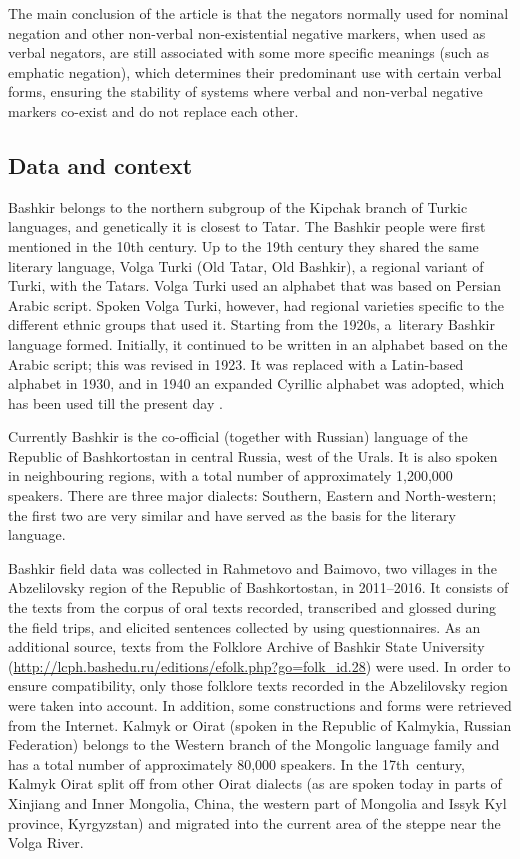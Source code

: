 \documentclass[output=paper]{langsci/langscibook}
\begin{document}
The main conclusion of the article is that the negators normally used for nominal negation and other non-verbal non-existential negative markers, when used as verbal negators, are still associated with some more specific meanings (such as emphatic negation), which determines their predominant use with certain verbal forms, ensuring the stability of systems where verbal and non-verbal negative markers co-exist and do not replace each other.

\subsection{Data and context}\label{sec:BK1.2}

Bashkir belongs to the northern subgroup of the Kipchak branch of Turkic languages, and genetically it is closest to Tatar. The Bashkir people were first mentioned in the 10th century. Up to the 19th century they shared the same literary language, Volga Turki (Old Tatar, Old Bashkir), a regional variant of Turki, with the Tatars. Volga Turki used an alphabet that was based on Persian Arabic script. Spoken Volga Turki, however, had regional varieties specific to the different ethnic groups that used it. Starting from the 1920s, a literary Bashkir language formed. Initially, it continued to be written in an alphabet based on the Arabic script; this was revised in 1923. It was replaced with a Latin-based alphabet in 1930, and in 1940 an expanded Cyrillic alphabet was adopted, which has been used till the present day \citep[11–12]{yuldashev1981a}.

Currently Bashkir is the co-official (together with Russian) language of the Republic of Bashkortostan in central Russia, west of the Urals. It is also spoken in neighbouring regions, with a total number of approximately 1,200,000 speakers. There are three major dialects: Southern, Eastern and North-western; the first two are very similar and have served as the basis for the literary language.

Bashkir field data was collected in Rahmetovo and Baimovo, two villages in the Abzelilovsky region of the Republic of Bashkortostan, in 2011–2016. It consists of the texts from the corpus of oral texts recorded, transcribed and glossed during the field trips, and elicited sentences collected by using questionnaires. As an additional source, texts from the Folklore Archive of Bashkir State University (\url{http://lcph.bashedu.ru/editions/efolk.php?go=folk_id.28}) were used. In order to ensure compatibility, only those folklore texts recorded in the Abzelilovsky region were taken into account. In addition, some constructions and forms were retrieved from the Internet.
Kalmyk or Oirat (spoken in the Republic of Kalmykia, Russian Federation) belongs to the Western branch of the Mongolic language family and has a total number of approximately 80,000 speakers. In the 17th century, Kalmyk Oirat split off from other Oirat dialects (as are spoken today in parts of Xinjiang and Inner Mongolia, China, the western part of Mongolia and Issyk Kyl province, Kyrgyzstan) and migrated into the current area of the steppe near the Volga River.
\end{document}
